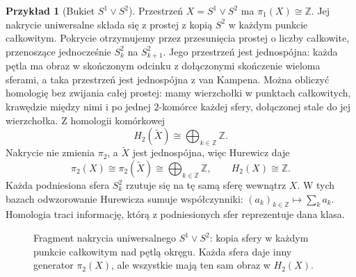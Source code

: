 \documentclass[11pt,a4paper,oneside]{report}
\newcommand{\R}{\mathbb{R}}
\newcommand{\Z}{\mathbb{Z}}
\theoremstyle{plain}
\theoremstyle{definition}
\newtheorem{przyklad}[twierdzenie]{Przykład}
\theoremstyle{remark}
\begin{document}
\begin{przyklad}[Bukiet $S^1\vee S^2$]
\label{prz:pi-bukiet-pokrycie}
Przestrzeń
$X=S^1\vee S^2$
ma $\pi_1(X)\cong\Z$.
Jej nakrycie uniwersalne
składa się z prostej
z kopią $S^2$ w każdym
punkcie całkowitym.
Pokrycie otrzymujemy przez przesunięcia prostej o liczby całkowite,
przenoszące jednocześnie $S_k^2$ na $S_{k+1}^2$.
Jego przestrzeń jest jednospójna: każda pętla ma obraz
w skończonym odcinku z dołączonymi skończenie wieloma sferami,
a taka przestrzeń jest jednospójna z van Kampena.
Można obliczyć homologię bez zwijania całej prostej:
mamy wierzchołki w punktach całkowitych, krawędzie między nimi
i po jednej $2$-komórce każdej sfery, dołączonej stale do jej wierzchołka.
Z homologii komórkowej
\[
 H_2(\widetilde X)
 \cong\bigoplus_{k\in\Z}\Z.
\]
Nakrycie nie zmienia
$\pi_2$, a
$\widetilde X$
jest jednospójna,
więc Hurewicz daje
\[
 \pi_2(X)\cong
 \pi_2(\widetilde X)
 \cong\bigoplus_{k\in\Z}\Z,
 \qquad
 H_2(X)\cong\Z.
\]
Każda podniesiona
sfera $S_k^2$
rzutuje się
na tę samą sferę
wewnątrz $X$.
W tych bazach
odwzorowanie Hurewicza
sumuje współczynniki:
$(a_k)_{k\in\Z}
\mapsto\sum_k a_k$.
Homologia traci
informację, którą
z podniesionych
sfer reprezentuje
dana klasa.
\end{przyklad}

\begin{figure}[!htbp]
\centering
{}
\caption{Fragment nakrycia uniwersalnego
$S^1\vee S^2$: kopia sfery w każdym
punkcie całkowitym nad pętlą okręgu.
Każda sfera daje inny generator
$\pi_2(X)$, ale wszystkie mają
ten sam obraz w $H_2(X)$.}
\label{fig:nakrycie-bukiet-sfer}
\end{figure}
\end{document}
